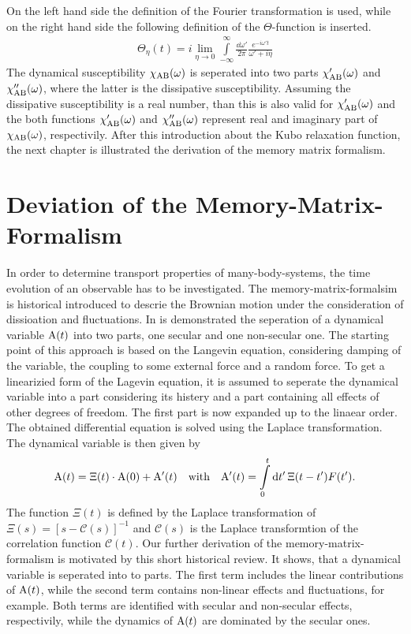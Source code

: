%
On the left hand side the definition of the Fourier transformation is used, while on the right hand side the following definition of the $\Theta$-function is inserted.
%
\begin{align}
	\Theta_{\eta}(t) = i \lim\limits_{\eta \to 0} \int\limits_{-\infty}^{\infty} \frac{\dd{\omega'}}{2\pi} \frac{e^{-i\omega't}}{\omega' + i\eta} 
\end{align}
%
The dynamical susceptibility $\chi_{\mathrm{AB}}(\omega)$ is seperated into two parts $\chi'_{\mathrm{AB}}(\omega)$ and $\chi''_{\mathrm{AB}}(\omega)$, where the latter is the dissipative susceptibility.
Assuming the dissipative susceptibility is a real number, than this is also valid for $\chi'_{\mathrm{AB}}(\omega)$ and the both functions $\chi'_{\mathrm{AB}}(\omega)$ and $\chi''_{\mathrm{AB}}(\omega)$ represent real and imaginary part of $\chi_{\mathrm{AB}}(\omega)$, respectivily.
After this introduction about the Kubo relaxation function, the next chapter is illustrated the derivation of the memory matrix formalism.
%
%
%
\section{Deviation of the Memory-Matrix-Formalism}
\label{sec:deviation of the memory-matrix-formalism}
%
%
%
In order to determine transport properties of many-body-systems, the time evolution of an observable has to be investigated.
The memory-matrix-formalsim is historical introduced to descrie the Brownian motion under the consideration of dissioation and fluctuations.
In \cite{Mori} is demonstrated the seperation of a dynamical variable $\mathrm{A}(t)$ into two parts, one secular and one non-secular one.
The starting point of this approach is based on the Langevin equation, considering damping of the variable, the coupling to some external force and a random force.
To get a linearizied form of the Lagevin equation, it is assumed to seperate the dynamical variable into a part considering its histery and a part containing all effects of other degrees of freedom.
The first part is now expanded up to the linaear order.
The obtained differential equation is solved using the Laplace transformation.
The dynamical variable is then given by
%
\begin{align}
	\mt{A}(t) = \Xi(t) \cdot \mt{A}(0) + \mt{A}'(t) \qq{with} \mt{A}'(t) = \int\limits_{0}^{t} \dd{t'} \Xi(t-t') F(t').
\end{align}
%
The function $\Xi(t)$ is defined by the Laplace transformation of $\Xi(s) = [s-\mathcal{C}(s)]^{-1}$ and $\mathcal{C}(s)$ is the Laplace transformtion of the correlation function $\mathcal{C}(t)$.
Our further derivation of the memory-matrix-formalism is motivated by this short historical review.
It shows, that a dynamical variable is seperated into to parts.
The first term includes the linear contributions of $\mathrm{A}(t)$, while the second term contains non-linear effects and fluctuations, for example.
Both terms are identified with secular and non-secular effects, respectivily, while the dynamics of $\mathrm{A}(t)$ are dominated by the secular ones.

